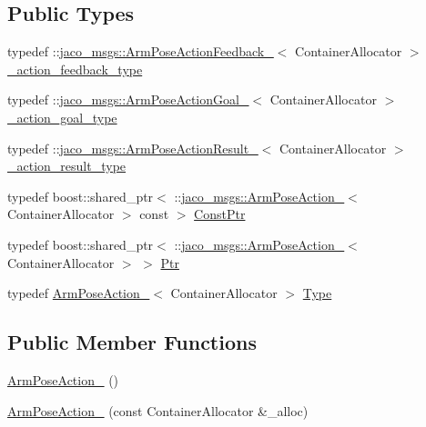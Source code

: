 \subsection*{Public Types}
\begin{DoxyCompactItemize}
\item 
typedef \+::\hyperlink{structjaco__msgs_1_1ArmPoseActionFeedback__}{jaco\+\_\+msgs\+::\+Arm\+Pose\+Action\+Feedback\+\_\+}$<$ Container\+Allocator $>$ \hyperlink{structjaco__msgs_1_1ArmPoseAction___ab82fcbe56cd092eae3d3f785366c3dc5}{\+\_\+action\+\_\+feedback\+\_\+type}
\item 
typedef \+::\hyperlink{structjaco__msgs_1_1ArmPoseActionGoal__}{jaco\+\_\+msgs\+::\+Arm\+Pose\+Action\+Goal\+\_\+}$<$ Container\+Allocator $>$ \hyperlink{structjaco__msgs_1_1ArmPoseAction___aa0a5074c68ff609cd35a2e7895dfadf2}{\+\_\+action\+\_\+goal\+\_\+type}
\item 
typedef \+::\hyperlink{structjaco__msgs_1_1ArmPoseActionResult__}{jaco\+\_\+msgs\+::\+Arm\+Pose\+Action\+Result\+\_\+}$<$ Container\+Allocator $>$ \hyperlink{structjaco__msgs_1_1ArmPoseAction___a212752482103a559acb2077bf8d90d71}{\+\_\+action\+\_\+result\+\_\+type}
\item 
typedef boost\+::shared\+\_\+ptr$<$ \+::\hyperlink{structjaco__msgs_1_1ArmPoseAction__}{jaco\+\_\+msgs\+::\+Arm\+Pose\+Action\+\_\+}$<$ Container\+Allocator $>$ const  $>$ \hyperlink{structjaco__msgs_1_1ArmPoseAction___a080bee6761560402dc95addde884c201}{Const\+Ptr}
\item 
typedef boost\+::shared\+\_\+ptr$<$ \+::\hyperlink{structjaco__msgs_1_1ArmPoseAction__}{jaco\+\_\+msgs\+::\+Arm\+Pose\+Action\+\_\+}$<$ Container\+Allocator $>$ $>$ \hyperlink{structjaco__msgs_1_1ArmPoseAction___a299629f21b494de927b8b2beda572a8b}{Ptr}
\item 
typedef \hyperlink{structjaco__msgs_1_1ArmPoseAction__}{Arm\+Pose\+Action\+\_\+}$<$ Container\+Allocator $>$ \hyperlink{structjaco__msgs_1_1ArmPoseAction___a7026e3c2bde54aceca4d9b54e1d76dd6}{Type}
\end{DoxyCompactItemize}
\subsection*{Public Member Functions}
\begin{DoxyCompactItemize}
\item 
\hyperlink{structjaco__msgs_1_1ArmPoseAction___adecc1f5202929ada464f3d041715eea0}{Arm\+Pose\+Action\+\_\+} ()
\item 
\hyperlink{structjaco__msgs_1_1ArmPoseAction___a738f120d3ec0e279fb3345187790cf1e}{Arm\+Pose\+Action\+\_\+} (const Container\+Allocator \&\+\_\+alloc)
\end{DoxyCompactItemize}
